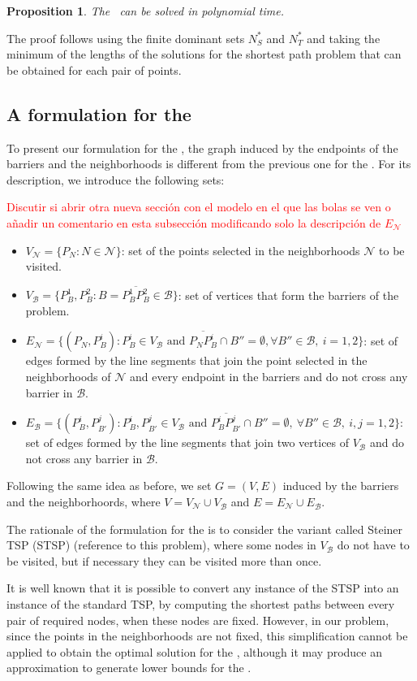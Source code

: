 \documentclass[a4paper]{elsarticle}
\newcommand{\SPPN}{{\sf{H-SPPN}\xspace }}
\newcommand{\TSPN}{{\sf{H-TSPN}\xspace }}
\newcommand{\B}{{\mathcal B}}
\newcommand{\VB}{{V^{}_{\mathcal B}}}
\newcommand{\EB}{{E^{}_{\mathcal B}}}
\newcommand{\VN}{{V^{}_{\mathcal N}}}
\newcommand{\EN}{{E^{}_{\mathcal N}}}
\newtheorem{prop}{Proposition}
\newcommand{\JP}[1]{{\color{armygreen}#1}}
\newcommand{\CV}[1]{{\color{atomictangerine}#1}}
\begin{document}
\CV{
\begin{prop}
The \SPPN \ can be solved in polynomial time.
\end{prop}


The proof follows using the finite dominant sets $N^*_{S}$ and $N^*_{T}$ and taking the minimum of the lengths of the solutions for the shortest path problem that can be obtained for each pair of points.
}

\subsection{A formulation for the \TSPN}
\JP{To present our formulation for the \TSPN, the graph induced by the endpoints of the barriers and the neighborhoods is different from the previous one for the \SPPN. For its description, we introduce the following sets:}

\textcolor{red}{Discutir si abrir otra nueva sección con el modelo en el que las bolas se ven o añadir un comentario en esta subsección modificando solo la descripción de $\EN$}

\begin{itemize}
\item $\VN=\{P_N:N\in\mathcal N\}$: set of the points selected in the neighborhoods $\mathcal N$ to be visited.
\item $\VB=\{P^1_B, P^2_B:B=\overline{P^1_B P^2_B}\in \mathcal B\}$: set of vertices that form the barriers of the problem.
\item $\EN=\{(P_N, P^i_{B}):P^i_B\in V_\B\text{ and } \overline{P_NP^i_B}\cap B''=\emptyset,\forall B''\in\B,\:i=1,2\}$: set of edges formed by the line segments that join the point selected in the neighborhoods of $\mathcal N$ and every endpoint in the barriers and do not cross any barrier in $\B$.
\item $\EB=\{(P^{i}_B, P^{j}_{B'}):P^i_B, P^j_{B'}\in \VB \text{ and } \overline{P^i_B P^j_{B'}}\cap B''=\emptyset,\:\forall B''\in\mathcal B,\:i, j=1,2\}$: set of edges formed by the line segments that join two vertices of $V_{\mathcal B}$ and do not cross any barrier in $\B$.
\end{itemize} 

\JP{Following the same idea as before, we set $G=(V,E)$ induced by the barriers and the neighborhoords, where $V=\VN\cup\VB$ and $E=\EN\cup\EB$. 

The rationale of the formulation for the \TSPN is to consider the variant called Steiner TSP (STSP) (reference to this problem), where some nodes in $\VB$ do not have to be visited, but if necessary they can be visited more than once. 

It is well known that it is possible to convert any instance of the STSP into an instance of the standard TSP, by computing the shortest paths between every pair of required nodes, when these nodes are fixed. However, in our problem, since the points in the neighborhoods are not fixed, this simplification cannot be applied to obtain the optimal solution for the \TSPN, although it may produce an approximation to generate lower bounds for the \TSPN.}
\end{document}
